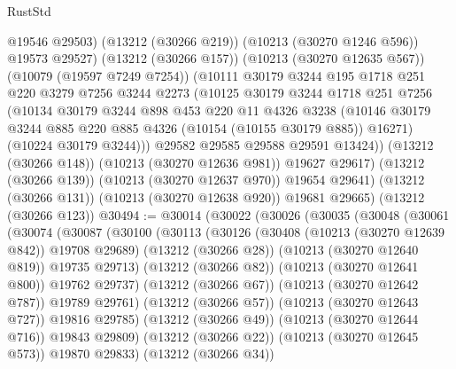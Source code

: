 \begin{lexlean}{RustStd}
\begin{coremodule}
{\begin{coremodule}
{{{{{{{{{{{{{{{{{{{{{{{{{{                @19546
                @29503)
              (@13212 (@30266 @219))
              (@10213 (@30270 @1246 @596))
              @19573
              @29527)
            (@13212 (@30266 @157))
            (@10213 (@30270 @12635 @567))
            (@10079 (@19597 @7249 @7254))
            (@10111
              @30179
              @3244
              @195
              @1718
              @251
              @220
              @3279
              @7256
              @3244
              @2273
              (@10125
                @30179
                @3244
                @1718
                @251
                @7256
                (@10134
                  @30179
                  @3244
                  @898
                  @453
                  @220
                  @11
                  @4326
                  @3238
                  (@10146 @30179 @3244 @885 @220 @885 @4326 (@10154 (@10155 @30179 @885)) @16271)
                  (@10224 @30179 @3244)))
              @29582
              @29585
              @29588
              @29591
              @13424))
          (@13212 (@30266 @148))
          (@10213 (@30270 @12636 @981))
          @19627
          @29617)
        (@13212 (@30266 @139))
        (@10213 (@30270 @12637 @970))
        @19654
        @29641)
      (@13212 (@30266 @131))
      (@10213 (@30270 @12638 @920))
      @19681
      @29665)
    (@13212 (@30266 @123))
@30494 := @30014
    (@30022
      (@30026
        (@30035
          (@30048
            (@30061
              (@30074
                (@30087
                  (@30100
                    (@30113
                      (@30126
                        (@30408 (@10213 (@30270 @12639 @842)) @19708 @29689)
                        (@13212 (@30266 @28))
                        (@10213 (@30270 @12640 @819))
                        @19735
                        @29713)
                      (@13212 (@30266 @82))
                      (@10213 (@30270 @12641 @800))
                      @19762
                      @29737)
                    (@13212 (@30266 @67))
                    (@10213 (@30270 @12642 @787))
                    @19789
                    @29761)
                  (@13212 (@30266 @57))
                  (@10213 (@30270 @12643 @727))
                  @19816
                  @29785)
                (@13212 (@30266 @49))
                (@10213 (@30270 @12644 @716))
                @19843
                @29809)
              (@13212 (@30266 @22))
              (@10213 (@30270 @12645 @573))
              @19870
              @29833)
            (@13212 (@30266 @34))
}}}}}}}}}}}}}}}}}}}}}}}}}}
\end{coremodule}}
\end{coremodule}
\end{lexlean}
